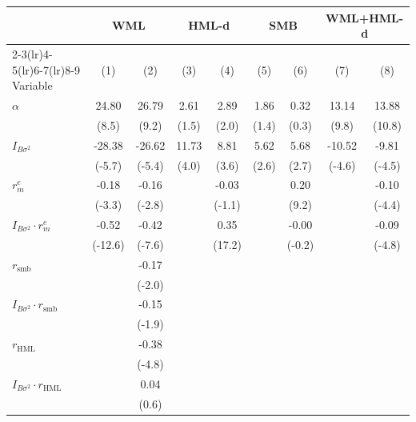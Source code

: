 \begin{tabular}{lcccccccc}
\toprule
 & \multicolumn{2}{c}{WML} & \multicolumn{2}{c}{HML-d} & \multicolumn{2}{c}{SMB} & \multicolumn{2}{c}{WML+HML-d} \\
\cmidrule(lr){2-3}\cmidrule(lr){4-5}\cmidrule(lr){6-7}\cmidrule(lr){8-9}
Variable & (1) & (2) & (3) & (4) & (5) & (6) & (7) & (8) \\
\midrule
$\alpha$ & 24.80 & 26.79 & 2.61 & 2.89 & 1.86 & 0.32 & 13.14 & 13.88 \\
 & (8.5) & (9.2) & (1.5) & (2.0) & (1.4) & (0.3) & (9.8) & (10.8) \\
$I_{B\sigma^2}$ & -28.38 & -26.62 & 11.73 & 8.81 & 5.62 & 5.68 & -10.52 & -9.81 \\
 & (-5.7) & (-5.4) & (4.0) & (3.6) & (2.6) & (2.7) & (-4.6) & (-4.5) \\
$r^e_m$ & -0.18 & -0.16 &  & -0.03 &  & 0.20 &  & -0.10 \\
 & (-3.3) & (-2.8) &  & (-1.1) &  & (9.2) &  & (-4.4) \\
$I_{B\sigma^2}\cdot r^e_m$ & -0.52 & -0.42 &  & 0.35 &  & -0.00 &  & -0.09 \\
 & (-12.6) & (-7.6) &  & (17.2) &  & (-0.2) &  & (-4.8) \\
$r_{\text{smb}}$ &  & -0.17 &  &  &  &  &  &  \\
 &  & (-2.0) &  &  &  &  &  &  \\
$I_{B\sigma^2}\cdot r_{\text{smb}}$ &  & -0.15 &  &  &  &  &  &  \\
 &  & (-1.9) &  &  &  &  &  &  \\
$r_{\text{HML}}$ &  & -0.38 &  &  &  &  &  &  \\
 &  & (-4.8) &  &  &  &  &  &  \\
$I_{B\sigma^2}\cdot r_{\text{HML}}$ &  & 0.04 &  &  &  &  &  &  \\
 &  & (0.6) &  &  &  &  &  &  \\
\bottomrule
\end{tabular}
